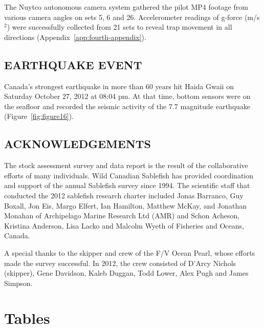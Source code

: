 \documentclass[12pt]{article}\usepackage[]{graphicx}\usepackage[]{color}
\begin{document}
The Nuytco autonomous camera system gathered the pilot MP4 footage from various camera angles on sets 5, 6 and 26. Accelerometer readings of g-force (m/s\(^2\)) were successfully collected from 21 sets to reveal trap movement in all directions (Appendix~\ref{app:fourth-appendix}).

\hypertarget{earthquake-event}{%
\subsection{EARTHQUAKE EVENT}\label{earthquake-event}}

Canada's strongest earthquake in more than 60 years hit Haida Gwaii on Saturday October 27, 2012 at 08:04 pm. At that time, bottom sensors were on the seafloor and recorded the seismic activity of the 7.7 magnitude earthquake (Figure~\ref{fig:figure16}).

\hypertarget{acknowledgements}{%
\subsection{ACKNOWLEDGEMENTS}\label{acknowledgements}}

The stock assessment survey and data report is the result of the collaborative efforts of many individuals. Wild Canadian Sablefish has provided coordination and support of the annual Sablefish survey since 1994. The scientific staff that conducted the 2012 sablefish research charter included Jonas Barranco, Guy Boxall, Jon Eis, Margo Elfert, Ian Hamilton, Matthew McKay, and Jonathan Monahan of Archipelago Marine Research Ltd (AMR) and Schon Acheson, Kristina Anderson, Lisa Lacko and Malcolm Wyeth of Fisheries and Oceans, Canada.

A special thanks to the skipper and crew of the F/V Ocean Pearl, whose efforts made the survey successful. In 2012, the crew consisted of D'Arcy Nichols (skipper), Gene Davidson, Kaleb Duggan, Todd Lower, Alex Pugh and James Simpson.

\clearpage

\hypertarget{tables}{%
\section{Tables}\label{tables}}
\end{document}
